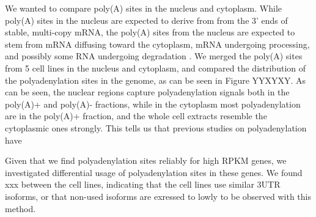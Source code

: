 \documentclass[a4paper]{article}
\begin{document}
We wanted to compare poly(A) sites in the nucleus and cytoplasm. While poly(A)
sites in the nucleus are expected to derive from from the 3' ends of stable,
multi-copy mRNA, the poly(A) sites from the nucleus are expected to stem from
mRNA diffusing toward the cytoplasm, mRNA undergoing processing, and possibly
some RNA undergoing degradation
\cite{shcherbik_polyadenylation_2010,slomovic_addition_2010}. We merged the
poly(A) sites from 5 cell lines in the nucleus and cytoplasm, and compared the
distribution of the polyadenylation sites in the genome, as can be seen in
Figure YYXYXY. As can be seen, the nuclear regions capture polyadenylation
signals both in the poly(A)+ and poly(A)- fractions, while in the cytoplasm
most polyadenylation are in the poly(A)+ fraction, and the whole cell extracts
resemble the cytoplasmic ones strongly. This tells us that previous studies on
polyadenylation have 

Given that we find polyadenylation sites reliably for high RPKM genes, we
investigated differential usage of polyadenylation sites in these genes. We
found xxx between the cell lines, indicating that the cell lines use similar
3UTR isoforms, or that non-used isoforms are exressed to lowly to be observed
with this method.


%

\end{document}
